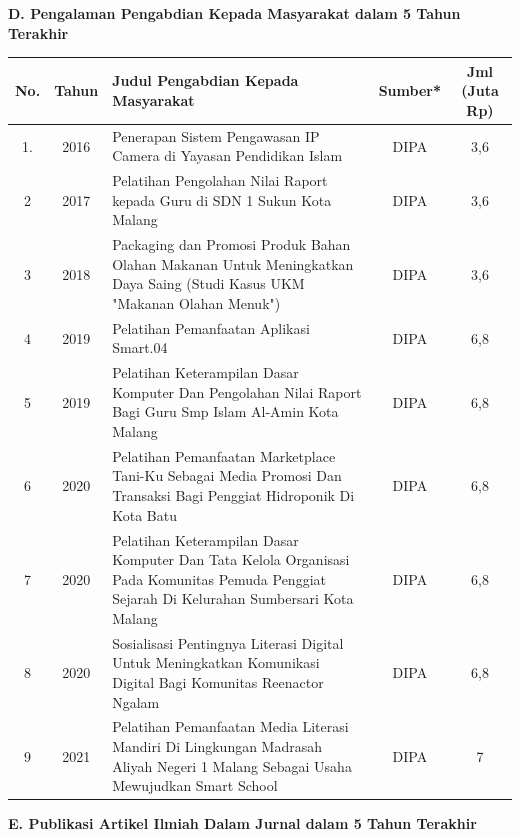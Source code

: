 \textbf{D. Pengalaman Pengabdian Kepada Masyarakat dalam 5 Tahun Terakhir}

{\footnotesize
\begin{longtable}{|c|c|p{6cm}|c|c|}
\hline
\textbf{No.} & \textbf{Tahun} & \textbf{Judul Pengabdian Kepada Masyarakat} & \textbf{Sumber*} & \textbf{Jml (Juta Rp)} \\
\hline
1. & 2016 & Penerapan Sistem Pengawasan IP Camera di Yayasan Pendidikan Islam & DIPA & 3,6 \\
\hline
2 & 2017 & Pelatihan Pengolahan Nilai Raport kepada Guru di SDN 1 Sukun Kota Malang & DIPA & 3,6 \\
\hline
3 & 2018 & Packaging dan Promosi Produk Bahan Olahan Makanan Untuk Meningkatkan Daya Saing (Studi Kasus UKM "Makanan Olahan Menuk") & DIPA & 3,6 \\
\hline
4 & 2019 & Pelatihan Pemanfaatan Aplikasi Smart.04 & DIPA & 6,8 \\
\hline
5 & 2019 & Pelatihan Keterampilan Dasar Komputer Dan Pengolahan Nilai Raport Bagi Guru Smp Islam Al-Amin Kota Malang & DIPA & 6,8 \\
\hline
6 & 2020 & Pelatihan Pemanfaatan Marketplace Tani-Ku Sebagai Media Promosi Dan Transaksi Bagi Penggiat Hidroponik Di Kota Batu & DIPA & 6,8 \\
\hline
7 & 2020 & Pelatihan Keterampilan Dasar Komputer Dan Tata Kelola Organisasi Pada Komunitas Pemuda Penggiat Sejarah Di Kelurahan Sumbersari Kota Malang & DIPA & 6,8 \\
\hline
8 & 2020 & Sosialisasi Pentingnya Literasi Digital Untuk Meningkatkan Komunikasi Digital Bagi Komunitas Reenactor Ngalam & DIPA & 6,8 \\
\hline
9 & 2021 & Pelatihan Pemanfaatan Media Literasi Mandiri Di Lingkungan Madrasah Aliyah Negeri 1 Malang Sebagai Usaha Mewujudkan Smart School & DIPA & 7 \\
\hline
\end{longtable}
}

\textbf{E. Publikasi Artikel Ilmiah Dalam Jurnal dalam 5 Tahun Terakhir}

